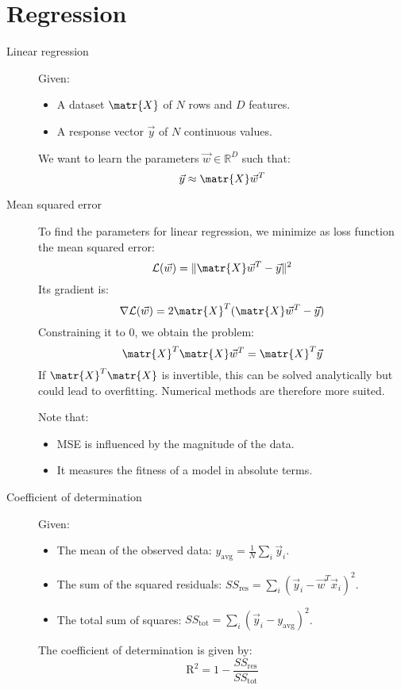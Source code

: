 \chapter{Regression}

\begin{description}
    \item[Linear regression] 
        Given:
        \begin{itemize}
            \item A dataset $\matr{X}$ of $N$ rows and $D$ features.
            \item A response vector $\vec{y}$ of $N$ continuous values.
        \end{itemize}
        We want to learn the parameters $\vec{w} \in \mathbb{R}^D$ such that:
        \[ \vec{y} \approx \matr{X}\vec{w}^T \]

    \item[Mean squared error] 
        To find the parameters for linear regression,
        we minimize as loss function the mean squared error:
        \[  
            \mathcal{L}(\vec{w}) = \Vert \matr{X}\vec{w}^T - \vec{y} \Vert^2    
        \]
        Its gradient is:
        \[ \nabla\mathcal{L}(\vec{w}) = 2\matr{X}^T(\matr{X}\vec{w}^T - \vec{y}) \]
        Constraining it to 0, we obtain the problem:
        \[ \matr{X}^T\matr{X}\vec{w}^T = \matr{X}^T\vec{y} \]
        If $\matr{X}^T\matr{X}$ is invertible, this can be solved analytically but could lead to overfitting.
        Numerical methods are therefore more suited.

        Note that:
        \begin{itemize}
            \item MSE is influenced by the magnitude of the data.
            \item It measures the fitness of a model in absolute terms.
        \end{itemize}

    \item[Coefficient of determination] 
        Given:
        \begin{itemize}
            \item The mean of the observed data: $y_\text{avg} = \frac{1}{N} \sum_i \vec{y}_i$.
            \item The sum of the squared residuals: $SS_\text{res} = \sum_i (\vec{y}_i - \vec{w}^T\vec{x}_i)^2$.
            \item The total sum of squares: $SS_\text{tot} = \sum_i (\vec{y}_i - y_\text{avg})^2$.
        \end{itemize}
        The coefficient of determination is given by:
        \[ \text{R}^2 = 1 - \frac{SS_\text{res}}{SS_\text{tot}} \]


\end{description}
